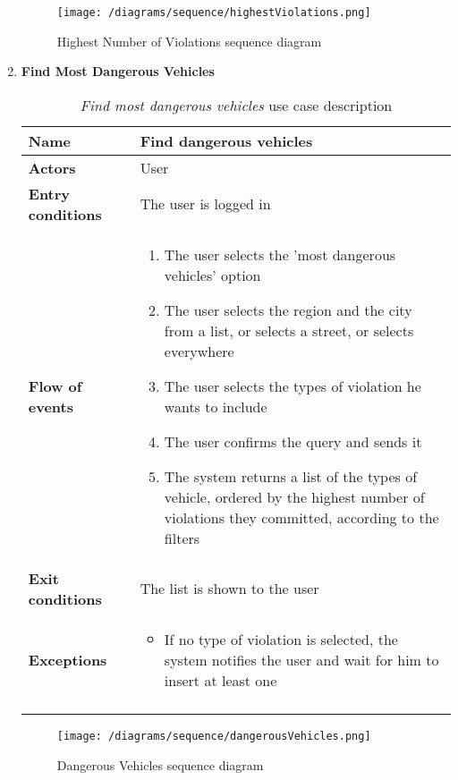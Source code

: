 \begin{enumerate}
				\begin{figure}[h]
					\centering
					\texttt{[image: /diagrams/sequence/highestViolations.png]}
					\caption{Highest Number of Violations sequence diagram}
				\end{figure}
			
				\FloatBarrier
			\item \textbf{Find Most Dangerous Vehicles}
				\begin{longtable}{p{0.26\linewidth}p{0.75\linewidth}}
					\toprule
					\textbf{Name} & \textbf{Find dangerous vehicles} \\
					\midrule
					\textbf{Actors} & User \\
					\midrule
					\textbf{Entry conditions} & The user is logged in \\
					\midrule
					\textbf{Flow of events} & 
					\begin{enumerate}
						\item The user selects the 'most dangerous vehicles' option
						\item The user selects the region and the city from a list, or selects a street, or selects everywhere
						\item The user selects the types of violation he wants to include
						\item The user confirms the query and sends it
						\item The system returns a list of the types of vehicle, ordered by the highest number of violations they committed, according to the filters
					\end{enumerate} \\
					\midrule
					\textbf{Exit conditions} & The list is shown to the user\\
					\midrule
					\textbf{Exceptions} & 
					\begin{itemize}
						\item 	If no type of violation is selected, the system notifies the user and wait for him to insert at least one	
					\end{itemize} \\
					\bottomrule
					\caption{\emph{Find most dangerous vehicles} use case description}
				\end{longtable}
			
				\begin{figure}[h]
					\centering
					\texttt{[image: /diagrams/sequence/dangerousVehicles.png]}
					\caption{Dangerous Vehicles sequence diagram}
				\end{figure}
			

\end{enumerate}
